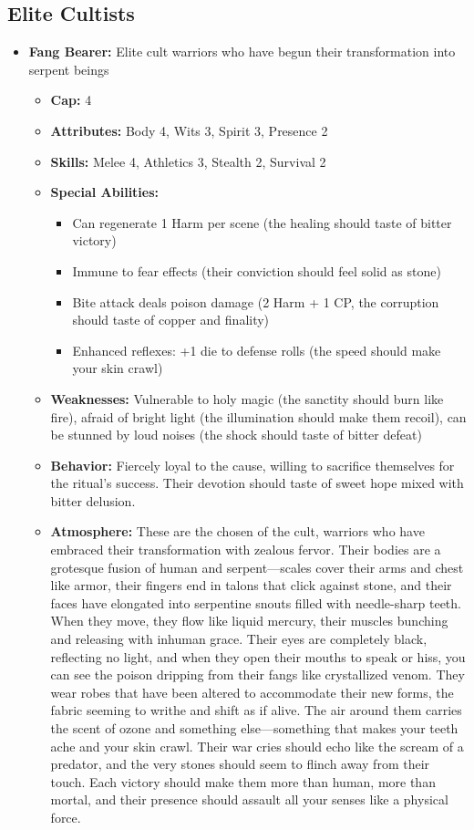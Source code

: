 \documentclass[11pt]{article}
\begin{document}
\begin{itemize}
\subsection{Elite Cultists}
\begin{itemize}
\item \textbf{Fang Bearer:} Elite cult warriors who have begun their transformation into serpent beings
  \begin{itemize}
  \item \textbf{Cap:} 4
  \item \textbf{Attributes:} Body 4, Wits 3, Spirit 3, Presence 2
  \item \textbf{Skills:} Melee 4, Athletics 3, Stealth 2, Survival 2
  \item \textbf{Special Abilities:}
    \begin{itemize}
    \item Can regenerate 1 Harm per scene (the healing should taste of bitter victory)
    \item Immune to fear effects (their conviction should feel solid as stone)
    \item Bite attack deals poison damage (2 Harm + 1 CP, the corruption should taste of copper and finality)
    \item Enhanced reflexes: +1 die to defense rolls (the speed should make your skin crawl)
    \end{itemize}
  \item \textbf{Weaknesses:} Vulnerable to holy magic (the sanctity should burn like fire), afraid of bright light (the illumination should make them recoil), can be stunned by loud noises (the shock should taste of bitter defeat)
  \item \textbf{Behavior:} Fiercely loyal to the cause, willing to sacrifice themselves for the ritual's success. Their devotion should taste of sweet hope mixed with bitter delusion.
  \item \textbf{Atmosphere:} These are the chosen of the cult, warriors who have embraced their transformation with zealous fervor. Their bodies are a grotesque fusion of human and serpent—scales cover their arms and chest like armor, their fingers end in talons that click against stone, and their faces have elongated into serpentine snouts filled with needle-sharp teeth. When they move, they flow like liquid mercury, their muscles bunching and releasing with inhuman grace. Their eyes are completely black, reflecting no light, and when they open their mouths to speak or hiss, you can see the poison dripping from their fangs like crystallized venom. They wear robes that have been altered to accommodate their new forms, the fabric seeming to writhe and shift as if alive. The air around them carries the scent of ozone and something else—something that makes your teeth ache and your skin crawl. Their war cries should echo like the scream of a predator, and the very stones should seem to flinch away from their touch. Each victory should make them more than human, more than mortal, and their presence should assault all your senses like a physical force.
  \end{itemize}
\end{itemize}


\end{itemize}
\end{document}
